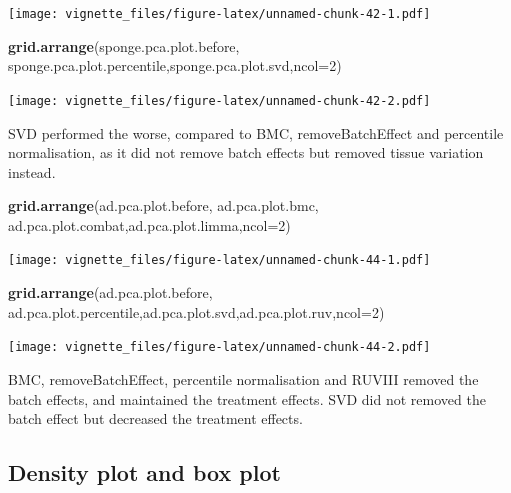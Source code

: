 \documentclass[]{book}
\newenvironment{Shaded}{\begin{snugshade}}{\end{snugshade}}
\newcommand{\KeywordTok}[1]{\textcolor[rgb]{0.13,0.29,0.53}{\textbf{#1}}}
\newcommand{\DataTypeTok}[1]{\textcolor[rgb]{0.13,0.29,0.53}{#1}}
\newcommand{\DecValTok}[1]{\textcolor[rgb]{0.00,0.00,0.81}{#1}}
\newcommand{\NormalTok}[1]{#1}
\begin{document}
\texttt{[image: vignette\_files/figure-latex/unnamed-chunk-42-1.pdf]}

\begin{Shaded}
\begin{Highlighting}[]
\KeywordTok{grid.arrange}\NormalTok{(sponge.pca.plot.before, sponge.pca.plot.percentile,sponge.pca.plot.svd,}\DataTypeTok{ncol=}\DecValTok{2}\NormalTok{)}
\end{Highlighting}
\end{Shaded}

\texttt{[image: vignette\_files/figure-latex/unnamed-chunk-42-2.pdf]}

SVD performed the worse, compared to BMC, removeBatchEffect and
percentile normalisation, as it did not remove batch effects but removed
tissue variation instead.

\begin{Shaded}
\begin{Highlighting}[]
\KeywordTok{grid.arrange}\NormalTok{(ad.pca.plot.before, ad.pca.plot.bmc, ad.pca.plot.combat,ad.pca.plot.limma,}\DataTypeTok{ncol=}\DecValTok{2}\NormalTok{)}
\end{Highlighting}
\end{Shaded}

\texttt{[image: vignette\_files/figure-latex/unnamed-chunk-44-1.pdf]}

\begin{Shaded}
\begin{Highlighting}[]
\KeywordTok{grid.arrange}\NormalTok{(ad.pca.plot.before, ad.pca.plot.percentile,ad.pca.plot.svd,ad.pca.plot.ruv,}\DataTypeTok{ncol=}\DecValTok{2}\NormalTok{)}
\end{Highlighting}
\end{Shaded}

\texttt{[image: vignette\_files/figure-latex/unnamed-chunk-44-2.pdf]}

BMC, removeBatchEffect, percentile normalisation and RUVIII removed the
batch effects, and maintained the treatment effects. SVD did not removed
the batch effect but decreased the treatment effects.

\subsection{Density plot and box
plot}\label{density-plot-and-box-plot-1}
\end{document}
